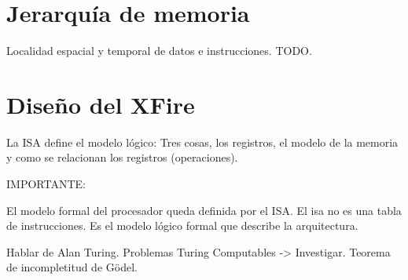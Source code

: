 \section{Jerarquía de memoria}
\label{sec:mem_hierarchy}

Localidad espacial y temporal de datos e instrucciones. TODO.

\section{Diseño del XFire}

La ISA define el modelo lógico: Tres cosas, los registros, el modelo de la
memoria y como se relacionan los registros (operaciones).



IMPORTANTE:

El modelo formal del procesador queda definida por el ISA. El isa no es una tabla de instrucciones. Es el modelo lógico formal que describe la arquitectura.

Hablar de Alan Turing. Problemas Turing Computables -> Investigar. Teorema de incompletitud de Gödel.
